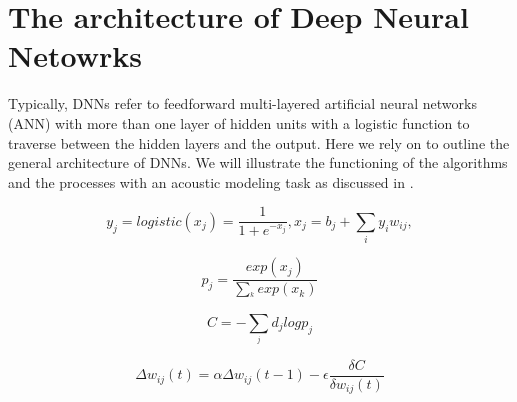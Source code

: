 \documentclass[12pt, titlepage, reqno]{article}
\begin{document}
\section{The architecture of Deep Neural Netowrks}
Typically, DNNs refer to feedforward multi-layered artificial neural networks (ANN) with more than one layer of hidden units with a logistic function to traverse between the hidden layers and the output. Here we rely on \cite{hinton2012} to outline the general architecture of DNNs. We will illustrate the functioning of the algorithms and the processes with an acoustic modeling task as discussed in \cite{hinton2012}. 
\begin{center}

\begin{equation}
y_{j}=logistic(x_{j})=\frac{1}{1+e^{-x_{j}}}, x_{j} = b_{j} + \sum_{i}y_{i}w_{ij},

\end{equation}

\begin{equation}
p_{j}=\frac{exp(x_{j})}{\sum_^{k}exp(x_{k})}
\end{equation}

\begin{equation}
C=-{\sum_^{j}}d_{j} log p_{j}
\end{equation}

\begin{equation}
\Delta w_{ij}(t)=\alpha\Delta w_{ij}(t-1) - \epsilon \frac{\delta C}{\delta w_{ij}(t)}
\end{equation}

\end{center}



\end{document}
